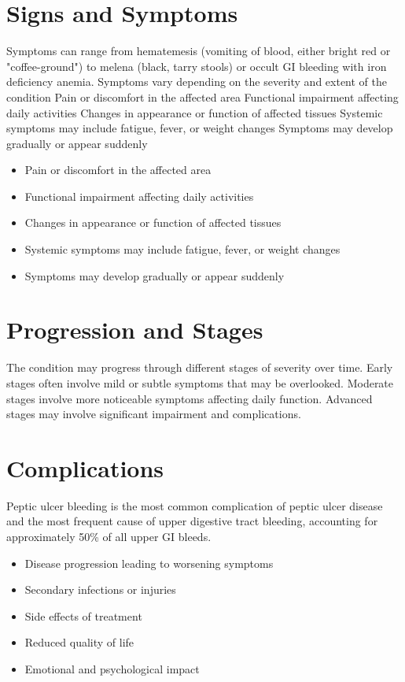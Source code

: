 \section{Signs and Symptoms}
Symptoms can range from hematemesis (vomiting of blood, either bright red or "coffee-ground") to melena (black, tarry stools) or occult GI bleeding with iron deficiency anemia. Symptoms vary depending on the severity and extent of the condition Pain or discomfort in the affected area Functional impairment affecting daily activities Changes in appearance or function of affected tissues Systemic symptoms may include fatigue, fever, or weight changes Symptoms may develop gradually or appear suddenly

\begin{itemize}[noitemsep]
  \item Pain or discomfort in the affected area
  \item Functional impairment affecting daily activities
  \item Changes in appearance or function of affected tissues
  \item Systemic symptoms may include fatigue, fever, or weight changes
  \item Symptoms may develop gradually or appear suddenly
\end{itemize}
\section{Progression and Stages}
The condition may progress through different stages of severity over time. Early stages often involve mild or subtle symptoms that may be overlooked. Moderate stages involve more noticeable symptoms affecting daily function. Advanced stages may involve significant impairment and complications.
\section{Complications}
Peptic ulcer bleeding is the most common complication of peptic ulcer disease and the most frequent cause of upper digestive tract bleeding, accounting for approximately 50\% of all upper GI bleeds.

\begin{itemize}[noitemsep]
  \item Disease progression leading to worsening symptoms
  \item Secondary infections or injuries
  \item Side effects of treatment
  \item Reduced quality of life
  \item Emotional and psychological impact
\end{itemize}
